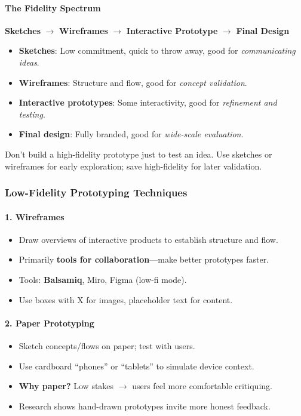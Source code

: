 \paragraph*{The Fidelity Spectrum}

\begin{center}
\textbf{Sketches} $\to$ \textbf{Wireframes} $\to$ \textbf{Interactive Prototype} $\to$ \textbf{Final Design}
\end{center}

\begin{itemize}
  \item \textbf{Sketches}: Low commitment, quick to throw away, good for \textit{communicating ideas}.
  \item \textbf{Wireframes}: Structure and flow, good for \textit{concept validation}.
  \item \textbf{Interactive prototypes}: Some interactivity, good for \textit{refinement and testing}.
  \item \textbf{Final design}: Fully branded, good for \textit{wide-scale evaluation}.
\end{itemize}

\begin{tipbox}
Don't build a high-fidelity prototype just to test an idea. Use sketches or wireframes for early exploration; save high-fidelity for later validation.
\end{tipbox}

\subsubsection*{Low-Fidelity Prototyping Techniques}

\paragraph*{1. Wireframes}
\begin{itemize}
  \item Draw overviews of interactive products to establish structure and flow.
  \item Primarily \textbf{tools for collaboration}---make better prototypes faster.
  \item Tools: \textbf{Balsamiq}, Miro, Figma (low-fi mode).
  \item Use boxes with X for images, placeholder text for content.
\end{itemize}

\paragraph*{2. Paper Prototyping}
\begin{itemize}
  \item Sketch concepts/flows on paper; test with users.
  \item Use cardboard ``phones'' or ``tablets'' to simulate device context.
  \item \textbf{Why paper?} Low stakes $\to$ users feel more comfortable critiquing.
  \item Research shows hand-drawn prototypes invite more honest feedback.
\end{itemize}

